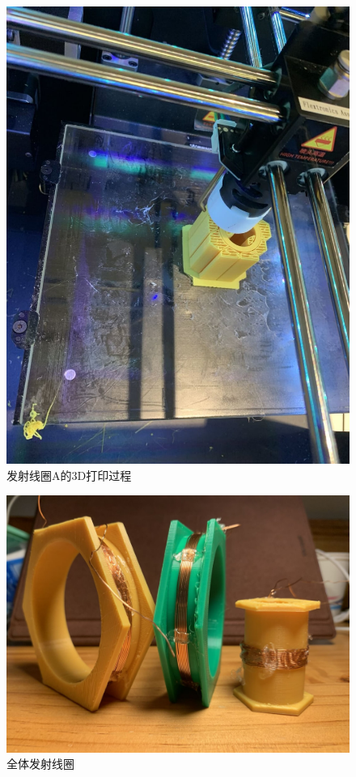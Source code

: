 \documentclass[conference]{IEEEtran}
\theoremstyle{break}
\begin{document}
\begin{figure}[htbp]
        \centerline{\includegraphics[scale=0.1]{发射线圈打印.png}}
        \caption{发射线圈A的3D打印过程}
        \label{fig}
        \end{figure}
\begin{figure}[htbp]
        \centerline{\includegraphics[scale=0.1]{发射线圈全家福.png}}
        \caption{全体发射线圈}
        \label{fig}
        \end{figure}
\leavevmode\\
\end{document}

